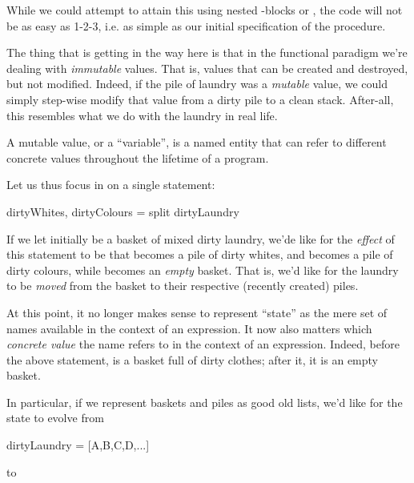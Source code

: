 While we could attempt to attain this using nested -blocks or
, the code will not be as easy as 1-2-3, i.e.  as
simple as our initial specification of the procedure.

The thing that is getting in the way here is that in the functional paradigm
we're dealing with \emph{immutable} values. That is, values that can be created
and destroyed, but not modified. Indeed, if the pile of laundry was a
\emph{mutable} value, we could simply step-wise modify that value from a dirty
pile to a clean stack. After-all, this resembles what we do with the laundry in
real life.

\begin{definition}

A mutable value, or a ``variable'', is a named entity that can refer to
different concrete values throughout the lifetime of a program.

\end{definition}

Let us thus focus in on a single statement:

\begin{code}
dirtyWhites, dirtyColours = split dirtyLaundry
\end{code}

If we let  initially be a basket of mixed dirty laundry,
we'de like for the \emph{effect} of this statement to be that 
becomes a pile of dirty whites, and  becomes a pile of dirty
colours, while  becomes an \emph{empty} basket. That is, we'd
like for the laundry to be \emph{moved} from the basket to their respective
(recently created) piles.

At this point, it no longer makes sense to represent ``state'' as the mere set
of names available in the context of an expression. It now also matters which
\emph{concrete value} the name refers to in the context of an expression.
Indeed, before the above statement,  is a basket full of
dirty clothes; after it, it is an empty basket.

In particular, if we represent baskets and piles as good old lists, we'd like
for the state to evolve from

\begin{code}
{ dirtyLaundry = [A,B,C,D,...] }
\end{code}

to

